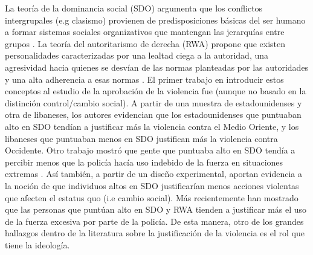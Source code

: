 \documentclass[12pt,twoside]{templates/facsothesis}
\begin{document}
La teoría de la dominancia social (SDO) argumenta que los conflictos intergrupales (e.g clasismo) provienen de predisposiciones básicas del ser humano a formar sistemas sociales organizativos que mantengan las jerarquías entre grupos \citep{Sidanius1999}. La teoría del autoritarismo de derecha (RWA) propone que existen personalidades caracterizadas por una lealtad ciega a la autoridad, una agresividad hacia quienes se desvían de las normas planteadas por las autoridades y una alta adherencia a esas normas \citep{Altemeyer1988}. El primer trabajo en introducir estos conceptos al estudio de la aprobación de la violencia fue \citet{Henry2005} (aunque no basado en la distinción control/cambio social). A partir de una muestra de estadounidenses y otra de libaneses, los autores evidencian que los estadounidenses que puntuaban alto en SDO tendían a justificar más la violencia contra el Medio Oriente, y los libaneses que puntuaban menos en SDO justifican más la violencia contra Occidente. Otro trabajo mostró que gente que puntuaba alto en SDO tendía a percibir menos que la policía hacía uso indebido de la fuerza en situaciones extremas \citep{Perkins2006}. Así también, a partir de un diseño experimental, \citet{Lemieux2012} aportan evidencia a la noción de que individuos altos en SDO justificarían menos acciones violentas que afecten el estatus quo (i.e cambio social). Más recientemente \citet{Gerber2017b} han mostrado que las personas que puntúan alto en SDO y RWA tienden a justificar más el uso de la fuerza excesiva por parte de la policía. De esta manera, otro de los grandes hallazgos dentro de la literatura sobre la justificación de la violencia es el rol que tiene la ideología.
\end{document}

